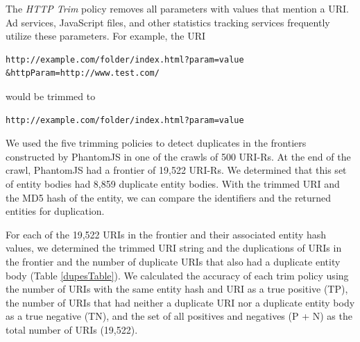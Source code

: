 \documentclass{sig-alternate}
\begin{document}
The \emph{HTTP Trim} policy removes all parameters with values that mention a URI. Ad services, JavaScript files, and other statistics tracking services frequently utilize these parameters. 
For example, the URI 

\vskip -3mm
\begin{verbatim}
http://example.com/folder/index.html?param=value
&httpParam=http://www.test.com/
\end{verbatim}
\vskip -3mm

\noindent would be trimmed to 
\vskip -3mm
 
\begin{verbatim}
http://example.com/folder/index.html?param=value
\end{verbatim}
\vskip -3mm
  

We used the five trimming policies to detect duplicates in the frontiers constructed by PhantomJS in one of the crawls of 500 URI-Rs. At the end of the crawl, PhantomJS had a frontier of 19,522 URI-Rs. We determined that this set of entity bodies had 8,859 duplicate entity bodies. With the trimmed URI and the MD5 hash of the entity, we can compare the identifiers and the returned entities for duplication. 


For each of the 19,522 URIs in the frontier and their associated entity hash values, we determined the trimmed URI string and the duplications of URIs in the frontier and the number of duplicate URIs that also had a duplicate entity body (Table \ref{dupesTable}). We calculated the accuracy of each trim policy using the number of URIs with the same entity hash and URI as a true positive (TP), the number of URIs that had neither a duplicate URI nor a duplicate entity body as a true negative (TN), and the set of all positives and negatives (P + N) as the total number of URIs (19,522). 
\end{document}
